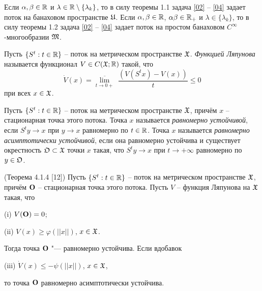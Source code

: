 \smallskip

\begin{remark}[2.1] Если $\alpha, \beta\in \Bbb R$ и $\lambda\in {\Bbb R}\setminus \{\lambda_k\}$, то в силу теоремы 1.1 задача \eqref{02} -- \eqref{04} задает поток на банаховом пространстве $\frak U$. Если $\alpha, \beta\in\Bbb R$, $\alpha\beta\in\Bbb R_+$ и $\lambda\in\{\lambda_k\}$, то в силу теоремы 1.2 задача \eqref{02} -- \eqref{04} задает поток на простом банаховом $C^\infty$-многообразии $\frak M$. \end{remark}

\smallskip

\begin{definition}[2.2] Пусть $\{S^t: t\in \Bbb R\}$ -- поток на метрическом пространстве $\frak X$. {\it Функцией Ляпунова} называется функционал $V\in C(\frak X; \Bbb R)$ такой, что $$\dot{V} (x)=\overline{\lim\limits_{t\to 0+}} \,\,\displaystyle\frac{(V(S^tx)-V(x))}{t} \leq 0$$ при всех $x\in \frak X$.\end{definition}

\smallskip

\begin{definition}[2.3] Пусть $\{S^t: t\in \Bbb R\}$ -- поток на метрическом пространстве $\frak X$, причём $x$ -- стационарная точка этого потока. Точка $x$ называется {\it равномерно устойчивой}, если $S^ty\to x$ при $y\to x$ равномерно по $t\in \Bbb R$. Точка $x$ называется {\it равномерно асимптотически устойчивой}, если она равномерно устойчива и существует окрестность $\frak O\subset\frak X$ точки $x$ такая, что $S^ty\to x$ при $t\to +\infty$ равномерно по $y\in\frak O$.\end{definition}

\smallskip

 \begin{theorem}[2.1] {\rm (Теорема 4.1.4 [12])}  Пусть $\{S^t: t\in \Bbb R\}$ -- поток на метрическом пространстве $\frak X$, причём $\bf O$ -- стационарная точка этого потока. Пусть $V$ -- функция Ляпунова на $\frak X$ такая, что

{\rm (i)} $V({\bf O})=0$;

{\rm (ii)} $V(x)\geq \varphi (||x||)$, $x\in\frak X$.

\noindent Тогда точка $\bf O$ "--- равномерно устойчива. Если вдобавок

{\rm (iii)} $\dot{V} (x)\leq - \psi (||x||)$, $x\in\frak X$,

\noindent то точка  $\bf O$ равномерно асимптотически устойчива.\end{theorem}


